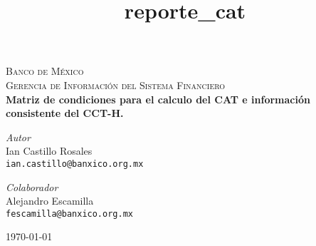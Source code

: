 \documentclass{report}
\title{reporte_cat}
\begin{document}
\begin{titlepage}
\begin{center}
\textsc{\Large Banco de México}\\[1.5cm]
\textsc{\Large Gerencia de Información del Sistema Financiero}\\[0.75cm]
{ \huge \bfseries Matriz de condiciones para el calculo del CAT e información consistente del CCT-H. \\[0.4cm] } %

\vspace{2cm}

\emph{Autor} \\
Ian Castillo Rosales \\
\texttt{ian.castillo@banxico.org.mx}

\vspace{0.5cm}

\emph{Colaborador} \\
Alejandro Escamilla \\
\texttt{fescamilla@banxico.org.mx}

\vfill

{\large \today} %
\end{center}
\end{titlepage}

\tableofcontents

\end{document}
